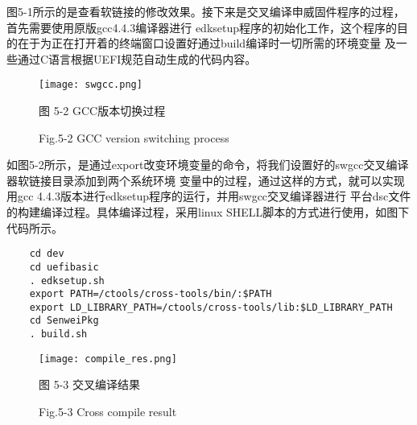 图5-1所示的是查看软链接的修改效果。接下来是交叉编译申威固件程序的过程，首先需要使用原版gcc4.4.3编译器进行
edksetup程序的初始化工作，这个程序的目的在于为正在打开着的终端窗口设置好通过build编译时一切所需的环境变量
及一些通过C语言根据UEFI规范自动生成的代码内容。

\begin{figure}[htb]
    \vspace{0cm}   
    \setlength{\abovecaptionskip}{0.3cm}
	\centering
    \texttt{[image: swgcc.png]}
    \caption*{图 5-2 GCC版本切换过程}
    \setlength{\belowcaptionskip}{-0.7cm}
    \caption*{Fig.5-2 GCC version switching process}
\end{figure}

如图5-2所示，是通过export改变环境变量的命令，将我们设置好的swgcc交叉编译器软链接目录添加到两个系统环境
变量中的过程，通过这样的方式，就可以实现用gcc 4.4.3版本进行edksetup程序的运行，并用swgcc交叉编译器进行
平台dsc文件的构建编译过程。具体编译过程，采用linux SHELL脚本的方式进行使用，如图下代码所示。

\begin{lstlisting}
    cd dev
    cd uefibasic
    . edksetup.sh
    export PATH=/ctools/cross-tools/bin/:$PATH
    export LD_LIBRARY_PATH=/ctools/cross-tools/lib:$LD_LIBRARY_PATH
    cd SenweiPkg
    . build.sh
\end{lstlisting}


\begin{figure}[htb]
    \vspace{0cm}   
    \setlength{\abovecaptionskip}{0.3cm}
	\centering
    \texttt{[image: compile\_res.png]}
    \caption*{图 5-3 交叉编译结果}
    \setlength{\belowcaptionskip}{-0.4cm}
    \caption*{Fig.5-3 Cross compile result}
\end{figure}

